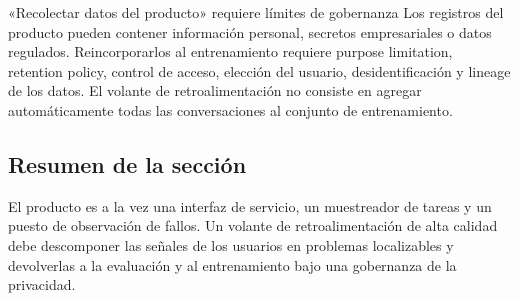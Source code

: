 \begin{warningbox}{«Recolectar datos del producto» requiere límites de gobernanza}
Los registros del producto pueden contener información personal, secretos empresariales o datos regulados. Reincorporarlos al entrenamiento requiere purpose limitation, retention policy, control de acceso, elección del usuario, desidentificación y lineage de los datos. El volante de retroalimentación no consiste en agregar automáticamente todas las conversaciones al conjunto de entrenamiento.
\end{warningbox}


\subsection{Resumen de la sección}

El producto es a la vez una interfaz de servicio, un muestreador de tareas y un puesto de observación de fallos. Un volante de retroalimentación de alta calidad debe descomponer las señales de los usuarios en problemas localizables y devolverlas a la evaluación y al entrenamiento bajo una gobernanza de la privacidad.
